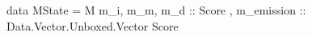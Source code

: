 data MState = M { m_i, m_m, m_d :: Score
                , m_emission :: Data.Vector.Unboxed.Vector Score
                }
